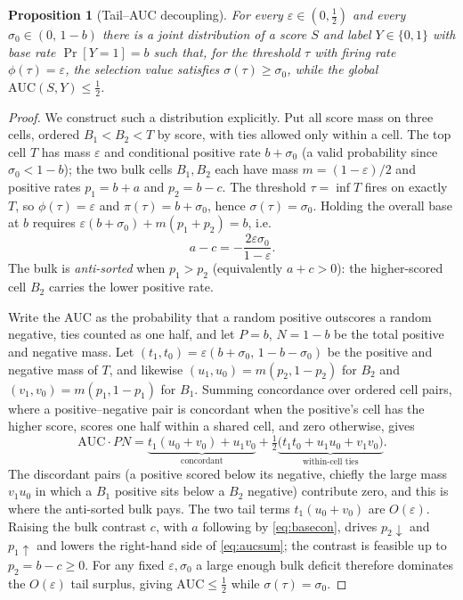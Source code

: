 \documentclass[10pt,a4paper,oneside]{article}
\theoremstyle{definition}
\theoremstyle{plain}
\newtheorem{proposition}{Proposition}
\begin{document}
\begin{proposition}[Tail--AUC decoupling]
\label{prop:tail}
For every $\varepsilon\in(0,\tfrac12)$ and every $\sigma_0\in(0,\,1-b)$ there is a
joint distribution of a score $S$ and label $Y\in\{0,1\}$ with base rate
$\Pr[Y=1]=b$ such that, for the threshold $\tau$ with firing rate $\phi(\tau)=\varepsilon$,
the selection value satisfies $\sigma(\tau)\ge\sigma_0$, while the global
$\mathrm{AUC}(S,Y)\le \tfrac12$.
\end{proposition}

\begin{proof}
We construct such a distribution explicitly. Put all score mass on three cells,
ordered $B_1 < B_2 < T$ by score, with ties allowed only within a cell. The top cell
$T$ has mass $\varepsilon$ and conditional positive rate $b+\sigma_0$ (a valid
probability since $\sigma_0<1-b$); the two bulk cells $B_1,B_2$ each have mass
$m=(1-\varepsilon)/2$ and positive rates $p_1=b+a$ and $p_2=b-c$. The threshold
$\tau=\inf T$ fires on exactly $T$, so $\phi(\tau)=\varepsilon$ and
$\pi(\tau)=b+\sigma_0$, hence $\sigma(\tau)=\sigma_0$. Holding the overall base at $b$
requires $\varepsilon(b+\sigma_0)+m(p_1+p_2)=b$, i.e.
\begin{equation}
\label{eq:basecon}
a-c=-\frac{2\varepsilon\sigma_0}{1-\varepsilon}.
\end{equation}
The bulk is \emph{anti-sorted} when $p_1>p_2$ (equivalently $a+c>0$): the
higher-scored cell $B_2$ carries the lower positive rate.

Write the AUC as the probability that a random positive outscores a random negative,
ties counted as one half, and let $P=b$, $N=1-b$ be the total positive and negative
mass. Let $(t_1,t_0)=\varepsilon(b+\sigma_0,\,1-b-\sigma_0)$ be the positive and
negative mass of $T$, and likewise $(u_1,u_0)=m(p_2,1-p_2)$ for $B_2$ and
$(v_1,v_0)=m(p_1,1-p_1)$ for $B_1$. Summing concordance over ordered cell pairs, where
a positive--negative pair is concordant when the positive's cell has the higher score,
scores one half within a shared cell, and zero otherwise, gives
\begin{equation}
\label{eq:aucsum}
\mathrm{AUC}\cdot PN
=\underbrace{t_1(u_0+v_0)+u_1 v_0}_{\text{concordant}}
+\tfrac12\underbrace{\big(t_1 t_0+u_1 u_0+v_1 v_0\big)}_{\text{within-cell ties}} .
\end{equation}
The discordant pairs (a positive scored below its negative, chiefly the large mass
$v_1 u_0$ in which a $B_1$ positive sits below a $B_2$ negative) contribute zero, and
this is where the anti-sorted bulk pays. The two tail terms $t_1(u_0+v_0)$ are
$O(\varepsilon)$. Raising the bulk contrast $c$, with $a$ following by
\eqref{eq:basecon}, drives $p_2\!\downarrow$ and $p_1\!\uparrow$ and lowers the
right-hand side of \eqref{eq:aucsum}; the contrast is feasible up to $p_2=b-c\ge 0$.
For any fixed $\varepsilon,\sigma_0$ a large enough bulk deficit therefore dominates the
$O(\varepsilon)$ tail surplus, giving $\mathrm{AUC}\le\tfrac12$ while $\sigma(\tau)=\sigma_0$.


\end{proof}
\end{document}
